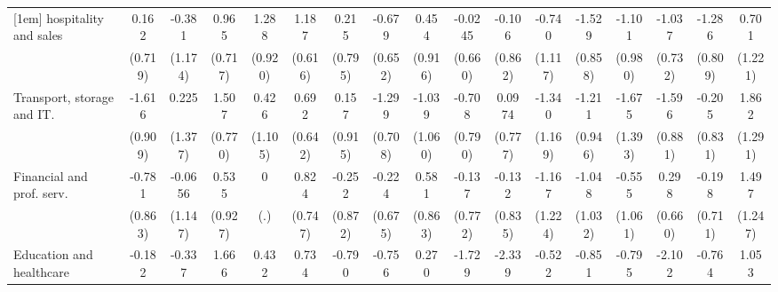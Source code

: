 {\begin{tabular}{l*{16}{c}}
[1em]
hospitality and sales&       0.162         &      -0.381         &       0.965         &       1.288         &       1.187         &       0.215         &      -0.679         &       0.454         &     -0.0245         &      -0.106         &      -0.740         &      -1.529         &      -1.101         &      -1.037         &      -1.286         &       0.701         \\
                    &     (0.719)         &     (1.174)         &     (0.717)         &     (0.920)         &     (0.616)         &     (0.795)         &     (0.652)         &     (0.916)         &     (0.660)         &     (0.862)         &     (1.117)         &     (0.858)         &     (0.980)         &     (0.732)         &     (0.809)         &     (1.221)         \\
[1em]
Transport, storage and IT.&      -1.616         &       0.225         &       1.507         &       0.426         &       0.692         &       0.157         &      -1.299         &      -1.039         &      -0.708         &      0.0974         &      -1.340         &      -1.211         &      -1.675         &      -1.596         &      -0.205         &       1.862         \\
                    &     (0.909)         &     (1.377)         &     (0.770)         &     (1.105)         &     (0.642)         &     (0.915)         &     (0.708)         &     (1.060)         &     (0.790)         &     (0.777)         &     (1.169)         &     (0.946)         &     (1.393)         &     (0.881)         &     (0.831)         &     (1.291)         \\
[1em]
Financial and prof. serv.&      -0.781         &     -0.0656         &       0.535         &           0         &       0.824         &      -0.252         &      -0.224         &       0.581         &      -0.137         &      -0.132         &      -1.167         &      -1.048         &      -0.555         &       0.298         &      -0.198         &       1.497         \\
                    &     (0.863)         &     (1.147)         &     (0.927)         &         (.)         &     (0.747)         &     (0.872)         &     (0.675)         &     (0.863)         &     (0.772)         &     (0.835)         &     (1.224)         &     (1.032)         &     (1.061)         &     (0.660)         &     (0.711)         &     (1.247)         \\
[1em]
Education and healthcare&      -0.182         &      -0.337         &       1.666\sym{*}  &       0.432         &       0.734         &      -0.790         &      -0.756         &       0.270         &      -1.729         &      -2.339\sym{*}  &      -0.522         &      -0.851         &      -0.795         &      -2.102\sym{*}  &      -0.764         &       1.053         \\

\end{tabular}}
